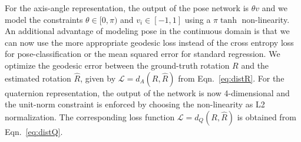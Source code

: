 \documentclass[10pt,twocolumn,letterpaper]{article}
\begin{document}
	For the axis-angle representation, the output of the pose network is $\theta v$ and we 
	model the constraints $\theta \in [0, \pi)$ and $v_i \in [-1, 1]$ using a $\pi \tanh$ 
	non-linearity. An additional advantage of modeling pose in the continuous domain is that we can 
	now use the more appropriate geodesic loss instead of the cross entropy loss for 
	pose-classification or the mean squared error for standard regression. We optimize the geodesic 
	error between the ground-truth rotation $R$ and the estimated rotation $\hat{R}$, given by 
	$\mathcal{L} = d_A(R, \hat{R})$ from Eqn.~\eqref{eq:distR}. For the quaternion representation, the output of the network is now 4-dimensional and the unit-norm constraint is enforced by choosing the non-linearity as L2 normalization. The corresponding loss function $\mathcal{L} = d_Q(R, \hat{R})$ is obtained from Eqn.~\eqref{eq:distQ}. 
	
\end{document}
